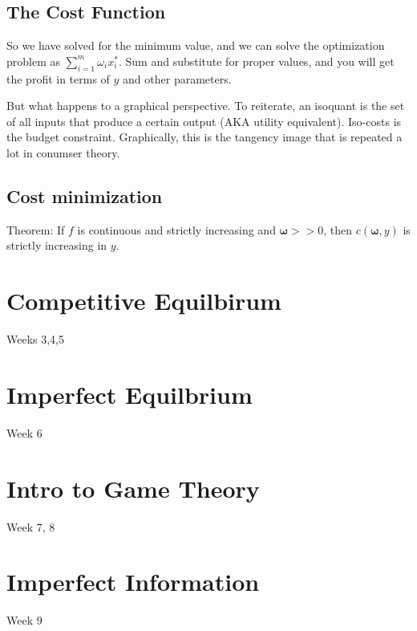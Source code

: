 \documentclass[12pt]{article}
\begin{document}
\subsection{The Cost Function}
So we have solved for the minimum value, and we can solve the optimization problem as $\sum_{i =1 }^m \omega_i x_i^*$. Sum and substitute for proper values, and you will get the profit in terms of $y$ and other parameters.


But what happens to a graphical perspective. To reiterate, an isoquant is the set of all inputs that produce a certain output (AKA utility equivalent). Iso-costs is the budget constraint. Graphically, this is the tangency image that is repeated a lot in conumser theory. 
\subsection{Cost minimization}
Theorem: If $f$ is continuous and strictly increasing and $\mathbf{\omega} >> 0$, then $c(\mathbf{\omega}, y)$ is strictly increasing in $y$. 
\section{Competitive Equilbirum}
Weeks 3,4,5
\section{Imperfect Equilbrium}
Week 6
\section{Intro to Game Theory}
Week 7, 8
\section{Imperfect Information}
Week 9
\end{document}
